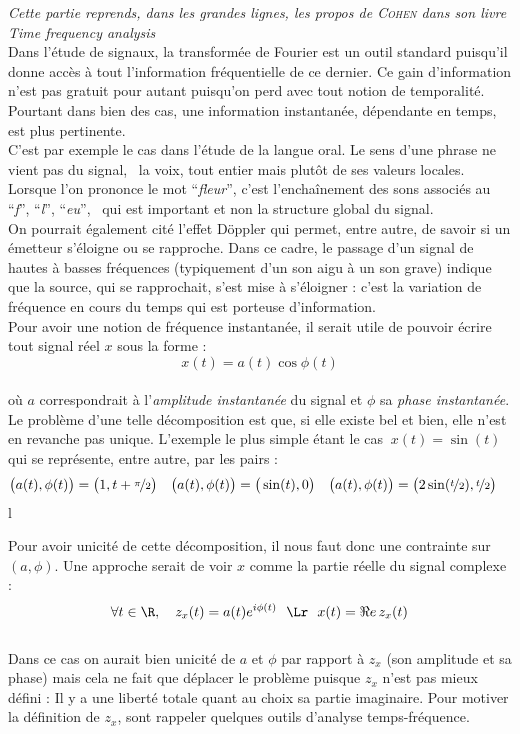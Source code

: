 \textit{Cette partie reprends, dans les grandes lignes, les propos de \textsc{Cohen} dans son livre \emph{Time frequency analysis} \cite{cohen_time_1995}}
\\
Dans l'étude de signaux, la transformée de Fourier est un outil standard puisqu'il donne accès à tout l'information fréquentielle de ce dernier. Ce gain d'information n'est pas gratuit pour autant puisqu'on perd avec tout notion de temporalité. Pourtant dans bien des cas, une information instantanée, dépendante en temps, est plus pertinente.
\\
C'est par exemple le cas dans l'étude de la langue oral. Le sens d'une phrase ne vient pas du signal, \ie~la voix, tout entier mais plutôt de ses valeurs locales. Lorsque l'on prononce le mot ``\textit{fleur}'', c'est l’enchaînement des sons associés au ``\textit{f}'', ``\textit{l}'', ``\textit{eu}'', \etc~qui est important et non la structure global du signal.  
\\
On pourrait également cité l'effet Döppler qui permet, entre autre, de savoir si un émetteur s'éloigne ou se rapproche. Dans ce cadre, le passage d'un signal de hautes à basses fréquences (typiquement d'un son aigu à un son grave) indique que la source, qui se rapprochait, s'est mise à s'éloigner : c'est la variation de fréquence en cours du temps qui est porteuse d'information.
\\

Pour avoir une notion de fréquence instantanée, il serait utile de pouvoir écrire tout signal réel $x$ sous la forme :
\begin{equation}\label{eq:amp-phase_instant}
	x(t) = a(t) \cos\phi(t)
\end{equation}
\\
où $a$ correspondrait à l'\textit{amplitude instantanée} du signal et $\phi$ sa \textit{phase instantanée}. Le problème d'une telle décomposition est que, si elle existe bel et bien, elle n'est en revanche pas unique. L'exemple le plus simple étant le cas $\ x(t) = \sin(t)\ $ qui se représente, entre autre, par les pairs :
\begin{align*}
	\big(a(t),\phi(t)\big) &= \big(1, t+\nicefrac{\pi}{2}\big)  &  
	\big(a(t),\phi(t)\big) &= \big(\sin(t), 0\big)  &  
	\big(a(t),\phi(t)\big) &= \big(2\sin(\nicefrac{t}{2}), \nicefrac{t}{2}\big)
\end{align*}
{\color{white}l}

Pour avoir unicité de cette décomposition, il nous faut donc une contrainte sur $(a,\phi)$. Une approche serait de voir $x$ comme la partie réelle du signal complexe :
\[\forall t\in\R,\quad z_x(t) = a(t)e^{i\phi(t)}\ \ \Lr\ \ x(t) = \Re e\, z_x(t)\]
\\
Dans ce cas on aurait bien unicité de $a$ et $\phi$ par rapport à $z_x$ (son amplitude et sa phase) mais cela ne fait que déplacer le problème puisque $z_x$ n'est pas mieux défini : Il y a une liberté totale quant au choix sa partie imaginaire. Pour motiver la définition de $z_x$, sont rappeler quelques outils d'analyse temps-fréquence.



